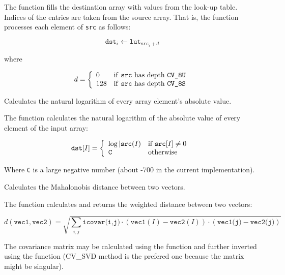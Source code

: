 The function fills the destination array with values from the look-up table. Indices of the entries are taken from the source array. That is, the function processes each element of \texttt{src} as follows:

\[
\texttt{dst}_i \leftarrow \texttt{lut}_{\texttt{src}_i + d}
\]

where

\[
d = \left\{ \begin{array}{l l} 0 & \mbox{if \texttt{src} has depth \texttt{CV\_8U}}\\ 128 & \mbox{if \texttt{src} has depth \texttt{CV\_8S}}\\ \end{array} \right.
\]

Calculates the natural logarithm of every array element's absolute value.


\begin{description}
\end{description}

The function calculates the natural logarithm of the absolute value of every element of the input array:

\[
\texttt{dst} [I] = \left\{ \begin{array}{l l} \log{|\texttt{src}(I)} & \mbox{if $\texttt{src}[I] \ne 0$ }\\ \texttt{C} & \mbox{otherwise}\\ \end{array} \right.
\]

Where \texttt{C} is a large negative number (about -700 in the current implementation).

Calculates the Mahalonobis distance between two vectors.


\begin{description}
\end{description}


The function calculates and returns the weighted distance between two vectors:

\[
d(\texttt{vec1},\texttt{vec2})=\sqrt{\sum_{i,j}{\texttt{icovar(i,j)}\cdot(\texttt{vec1}(I)-\texttt{vec2}(I))\cdot(\texttt{vec1(j)}-\texttt{vec2(j)})}}
\]

The covariance matrix may be calculated using the  function and further inverted using the  function (CV\_SVD method is the prefered one because the matrix might be singular).


